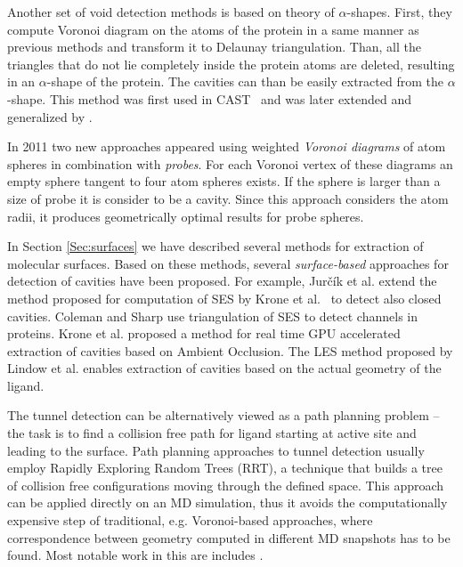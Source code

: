 Another set of void detection methods is based on theory of $\alpha$-shapes. First, they compute Voronoi diagram on the atoms of the protein in a same manner as previous methods and transform it to Delaunay triangulation. Than, all the triangles that do not lie completely inside the protein atoms are deleted, resulting in an $\alpha$-shape of the protein. The cavities can than be easily extracted from the $\alpha$-shape. This method was first used in CAST~\cite{liang1998anatomy} and was later extended and generalized by \cite{sridharamurthy2016extraction, kim2013tunnels, masood2015chexvis}.

In 2011 two new approaches \cite{olechnovivc2010voroprot, Lindow2011Voronoi} appeared using weighted \textit{Voronoi diagrams} of atom spheres in combination with \textit{probes}. For each Voronoi vertex of these diagrams an empty sphere tangent to four atom spheres exists. If the sphere is larger than a size of probe it is consider to be a cavity. Since this approach considers the atom radii, it produces geometrically optimal results for probe spheres.

In Section \ref{Sec:surfaces} we have described several methods for extraction of molecular surfaces. Based on these methods, several \textit{surface-based} approaches for detection of cavities have been proposed. For example, Jurčík et al. \cite{jurvcik2016accelerated} extend the method proposed for computation of SES by Krone et al.~\cite{6094043} to detect also closed cavities. Coleman and Sharp \cite{Coleman2009CHUNNEL} use triangulation of SES to detect channels in proteins. Krone et al. \cite{krone2013interactive} proposed a method for real time GPU accelerated extraction of cavities based on Ambient Occlusion. The LES method proposed by Lindow et al. \cite{lindow2014ligand} enables extraction of cavities based on the actual geometry of the ligand.

The tunnel detection can be alternatively viewed as a path planning problem -- the task is to find a collision free path for ligand starting at active site and leading to the surface. Path planning approaches to tunnel detection usually employ Rapidly Exploring Random Trees \cite{lavalle1998rapidly} (RRT), a technique that builds a tree of collision free configurations moving through the defined space. This approach can be applied directly on an MD simulation, thus it avoids the computationally expensive step of traditional, e.g. Voronoi-based approaches, where correspondence between geometry computed in different MD snapshots has to be found. Most notable work in this are includes \cite{cortes2005path, vonasek2016application, vonasek2017tunnel}.

